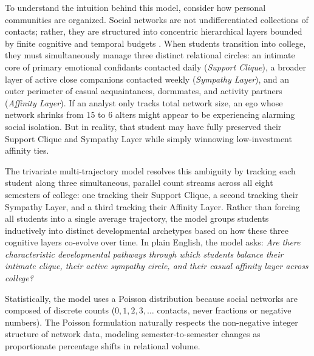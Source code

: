 \documentclass[12pt]{article}
\begin{document}
To understand the intuition behind this model, consider how personal communities are organized. Social networks are not undifferentiated collections of contacts; rather, they are structured into concentric hierarchical layers bounded by finite cognitive and temporal budgets \citep{dunbar1992neocortex, dunbar2018anatomy}. When students transition into college, they must simultaneously manage three distinct relational circles: an intimate core of primary emotional confidants contacted daily (\textit{Support Clique}), a broader layer of active close companions contacted weekly (\textit{Sympathy Layer}), and an outer perimeter of casual acquaintances, dormmates, and activity partners (\textit{Affinity Layer}). If an analyst only tracks total network size, an ego whose network shrinks from 15 to 6 alters might appear to be experiencing alarming social isolation. But in reality, that student may have fully preserved their Support Clique and Sympathy Layer while simply winnowing low-investment affinity ties.

The trivariate multi-trajectory model resolves this ambiguity by tracking each student along three simultaneous, parallel count streams across all eight semesters of college: one tracking their Support Clique, a second tracking their Sympathy Layer, and a third tracking their Affinity Layer. Rather than forcing all students into a single average trajectory, the model groups students inductively into distinct developmental archetypes based on how these three cognitive layers co-evolve over time. In plain English, the model asks: \textit{Are there characteristic developmental pathways through which students balance their intimate clique, their active sympathy circle, and their casual affinity layer across college?}

Statistically, the model uses a Poisson distribution because social networks are composed of discrete counts ($0, 1, 2, 3, \dots$ contacts, never fractions or negative numbers). The Poisson formulation naturally respects the non-negative integer structure of network data, modeling semester-to-semester changes as proportionate percentage shifts in relational volume.
\end{document}
